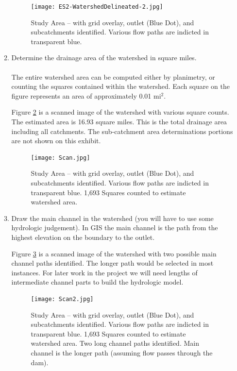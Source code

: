 \documentclass[12pt]{article}
\begin{document}
\begin{enumerate}
\begin{enumerate}
\begin{figure}[h!] %
   \centering
   \texttt{[image: ES2-WatershedDelineated-2.jpg]} 
   \caption{Study Area -- with grid overlay, outlet (Blue Dot), and subcatchments identified.  Various flow paths are indicted in transparent blue.}
   \label{fig:ES2-WatershedDelineated-2}
\end{figure}
\clearpage

\item Determine the drainage area of the watershed in square miles. \\~\\

The entire watershed area can be computed either by planimetry, or counting the squares contained within the watershed.   Each square on the figure represents an area of approximately 0.01 mi$^2$.

Figure \ref{fig:ES2-WatershedArea-2} is a scanned image of the watershed with various square counts.  The estimated area is 16.93 square miles.   This is the total drainage area including all catchments.  The sub-catchment area determinations portions are not shown on this exhibit.  

\begin{figure}[h!] %
   \centering
   \texttt{[image: Scan.jpg]} 
   \caption{Study Area -- with grid overlay, outlet (Blue Dot), and subcatchments identified.  Various flow paths are indicted in transparent blue.  1,693 Squares counted to estimate watershed area.}
   \label{fig:ES2-WatershedArea-2}
\end{figure}
\clearpage


\item Draw the main channel in the watershed (you will have to use some hydrologic judgement).  In GIS the main channel is the path from the highest elevation on the boundary to the outlet.

Figure \ref{fig:ES2-WatershedArea-3} is a scanned image of the watershed with two possible main channel paths identified.  The longer path would be selected in most instances.  For later work in the project we will need lengths of intermediate channel parts to build the hydrologic model.

\begin{figure}[h!] %
   \centering
   \texttt{[image: Scan2.jpg]} 
   \caption{Study Area -- with grid overlay, outlet (Blue Dot), and subcatchments identified.  Various flow paths are indicted in transparent blue.  1,693 Squares counted to estimate watershed area.  Two long channel paths identified.  Main channel is the longer path (assuming flow passes through the dam).}
   \label{fig:ES2-WatershedArea-3}
\end{figure}


\end{enumerate}
\end{enumerate}
\end{document}
